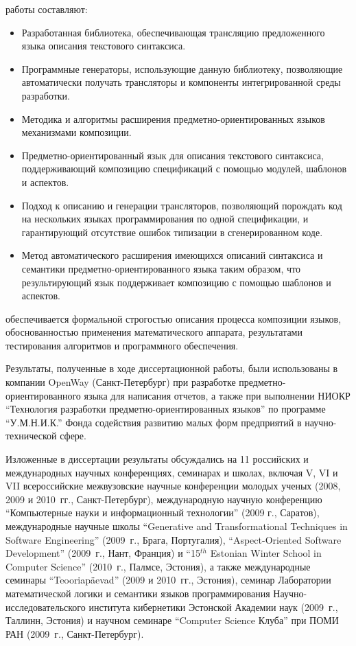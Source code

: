  работы составляют:
\begin{itemize}
\item Разработанная библиотека, обеспечивающая трансляцию предложенного языка описания текстового синтаксиса.
\item Программные генераторы, использующие данную библиотеку, позволяющие автоматически получать трансляторы и компоненты интегрированной среды разработки.
\item Методика и алгоритмы расширения предметно-ориентированных языков механизмами композиции.
\end{itemize}

\begin{itemize}
\item Предметно-ориентированный язык для описания текстового синтаксиса, поддерживающий композицию спецификаций с помощью модулей, шаблонов и аспектов.
\item Подход к описанию и генерации трансляторов, позволяющий порождать код на нескольких языках программирования по одной спецификации, и гарантирующий отсутствие ошибок типизации в сгенерированном коде.
\item Метод автоматического расширения имеющихся описаний синтаксиса и семантики предметно-ориентированного языка таким образом, что результирующий язык поддерживает композицию с помощью шаблонов и аспектов.
\end{itemize}

 обеспечивается формальной строгостью описания процесса композиции языков, обоснованностью применения математического аппарата, результатами тестирования алгоритмов и программного обеспечения.

 Результаты, полученные в ходе диссертационной работы, были использованы в компании OpenWay (Санкт-Петербург) при разработке предметно-ориентированного языка для написания отчетов, а также при выполнении НИОКР ``Технология разработки предметно-ориентированных языков'' по программе ``У.М.Н.И.К.'' Фонда содействия развитию малых форм предприятий в научно-технической сфере.

 Изложенные в диссертации результаты обсуждались на 11 российских и международных научных конференциях, семинарах и школах, включая V, VI и VII всероссийские межвузовские научные конференции молодых ученых (2008, 2009 и 2010~гг., Санкт-Петербург), международную научную конференцию ``Компьютерные науки и информационный технологии'' (2009 г., Саратов), международные научные школы ``Generative and Transformational Techniques in Software Engineering'' (2009~г., Брага, Португалия), ``Aspect-Oriented Software Development'' (2009~г., Нант, Франция) и ``15$^{th}$ Estonian Winter School in Computer Science'' (2010~г., Палмсе, Эстония), а также международные семинары ``Teooriapäevad'' (2009 и 2010~гг., Эстония), семинар Лаборатории математической логики и семантики языков программирования Научно-исследовательского института кибернетики Эстонской Академии наук (2009~г., Таллинн, Эстония) и научном семинаре ``Computer Science Клуба'' при ПОМИ РАН (2009~г., Санкт-Петербург).

